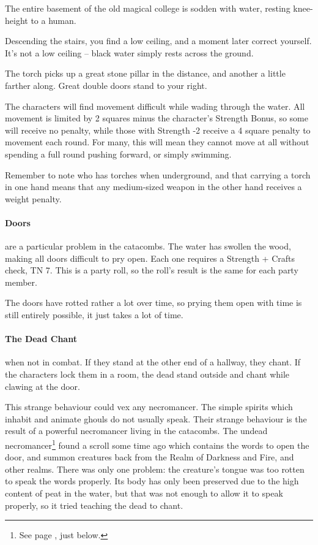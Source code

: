 \begin{multicols}{2}
The entire basement of the old magical college is sodden with water, resting knee-height to a human.

\begin{boxtext}
	Descending the stairs, you find a low ceiling, and a moment later correct yourself.  It's not a low ceiling -- black water simply rests across the ground.

	The torch picks up a great stone pillar in the distance, and another a little farther along.  Great double doors stand to your right.

\end{boxtext}

The characters will find movement difficult while wading through the water.  All movement is limited by 2 squares minus the character's Strength Bonus, so some will receive no penalty, while those with Strength -2 receive a 4 square penalty to movement each round.  For many, this will mean they cannot move at all without spending a full round pushing forward, or simply swimming.

Remember to note who has torches when underground, and that carrying a torch in one hand means that any medium-sized weapon in the other hand receives a weight penalty.

\paragraph{Doors} are a particular problem in the catacombs.  The water has swollen the wood, making all doors difficult to pry open.  Each one requires a Strength + Crafts check, TN 7.  This is a party roll, so the roll's result is the same for each party member.

The doors have rotted rather a lot over time, so prying them open with time is still entirely possible, it just takes a lot of time.

\paragraph{The Dead Chant} when not in combat.
If they stand at the other end of a hallway, they chant.
If the characters lock them in a room, the dead stand outside and chant while clawing at the door.

This strange behaviour could vex any necromancer.
The simple spirits which inhabit and animate ghouls do not usually speak.
Their strange behaviour is the result of a powerful necromancer living in the catacombs.
The undead necromancer\footnote{See page \pageref{undead_ogre}, just below.} found a scroll some time ago which contains the words to open the door, and summon creatures back from the Realm of Darkness and Fire, and other realms.
There was only one problem: the creature's tongue was too rotten to speak the words properly.
Its body has only been preserved due to the high content of peat in the water, but that was not enough to allow it to speak properly, so it tried teaching the dead to chant.


\end{multicols}

